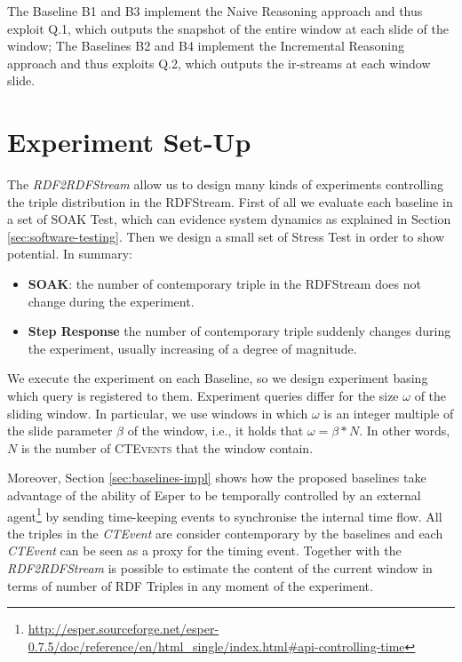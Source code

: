 The Baseline B1 and B3 implement the Naive Reasoning approach and thus exploit Q.1, which outputs the snapshot of the entire window at each slide of the window; The Baselines B2 and B4 implement the Incremental Reasoning approach and thus exploits Q.2, which outputs the ir-streams at each window slide.

\pagebreak
\section{Experiment Set-Up}

The \textit{RDF2RDFStream} allow us to design many kinds of experiments controlling the triple distribution in the RDFStream. First of all we evaluate each baseline in a set of SOAK Test, which can evidence system dynamics as explained in Section \ref{sec:software-testing}. Then we design a small set of Stress Test in order to show \name potential. In summary:

\begin{itemize}
\item \textbf{SOAK}: the number of contemporary triple in the RDFStream does not change during the experiment.
\item \textbf{Step Response} the number of contemporary triple suddenly changes during the experiment, usually increasing of a degree of magnitude.
\end{itemize}

We execute the experiment on each \name Baseline, so we design experiment basing which query is registered to them. Experiment queries differ for the size $\omega$ of the sliding window. In particular, we use windows in which $\omega$ is an integer multiple of the slide parameter $\beta$ of the window, i.e., it holds that $\omega = \beta * N$. In other words, $N$ is the number of \textsc{CTEvents} that the window contain. 

Moreover, Section \ref{sec:baselines-impl} shows how the proposed baselines take advantage of the ability of Esper to be temporally controlled by an external agent\footnote{\url{http://esper.sourceforge.net/esper-0.7.5/doc/reference/en/html_single/index.html#api-controlling-time}} by sending time-keeping events to synchronise the internal time flow. All the triples in the \textit{CTEvent} are consider contemporary by the baselines and each \textit{CTEvent} can be seen as a proxy for the timing event. Together with the \textit{RDF2RDFStream} is possible to estimate the content of the current window in terms of number of RDF Triples in any moment of the experiment.

